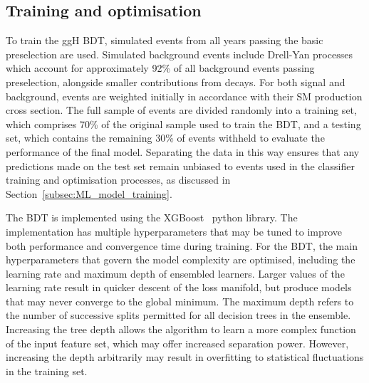 \subsection{Training and optimisation}

To train the ggH BDT,  simulated \ggH events from all years passing the basic preselection are used.
Simulated background events include Drell-Yan processes which account for approximately 92\% of all background events passing preselection, alongside smaller contributions from \ttbar decays.
For both signal and background, events are weighted initially in accordance with their SM production cross section. 
The full sample of events are divided randomly into a training set, which comprises 70\% of the original sample used to train the BDT, and a testing set, which contains the remaining 30\% of events withheld to evaluate the performance of the final model. Separating the data in this way ensures that any predictions made on the test set remain unbiased to events used in the classifier training and optimisation processes, as discussed in Section~\ref{subsec:ML_model_training}.


The BDT is implemented using the XGBoost~\cite{xgboost} python library. The implementation has multiple hyperparameters that may be tuned to improve both performance and convergence time during training. For the \ggH BDT, the main hyperparameters that govern the model complexity are optimised, including the learning rate and maximum depth of ensembled learners. Larger values of the learning rate result in quicker descent of the loss manifold, but produce models that may never converge to the global minimum. The maximum depth refers to the number of successive splits permitted for all decision trees in the ensemble. Increasing the tree depth allows the algorithm to learn a more complex function of the input feature set, which may offer increased separation power. However, increasing the depth arbitrarily may result in overfitting to statistical fluctuations in the training set. 

